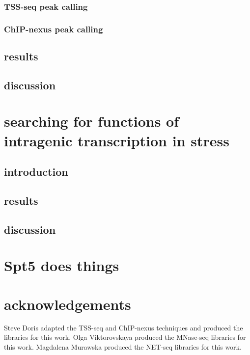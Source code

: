 \documentclass[11pt, a4paper]{article}
\begin{document}
\subsubsection{TSS-seq peak calling}

\subsubsection{ChIP-nexus peak calling}



\subsection{results}
\subsection{discussion}

\section{searching for functions of intragenic transcription in stress}
\subsection{introduction}
\subsection{results}
\subsection{discussion}

\section{Spt5 does things}

\section{acknowledgements}

Steve Doris adapted the TSS-seq and ChIP-nexus techniques and produced the libraries for this work. Olga Viktorovskaya produced the MNase-seq libraries for this work. Magdalena Murawska produced the NET-seq libraries for this work.

{}

\end{document}
